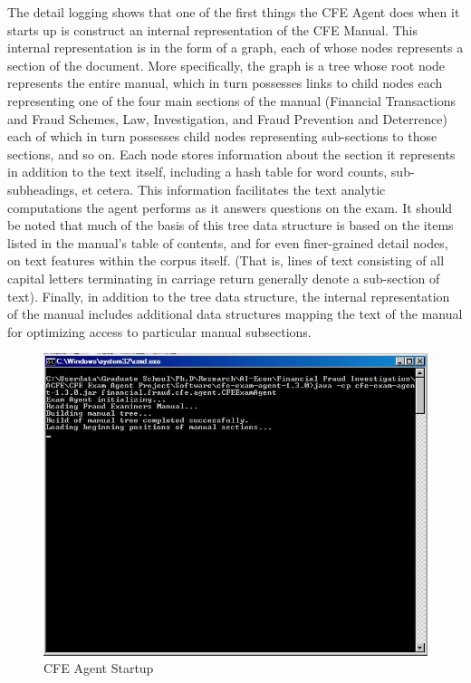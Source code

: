 The detail logging shows that one of the first things the CFE Agent does when it starts up is construct an internal representation of the CFE Manual.  This internal representation is in the form of a graph, each of whose nodes represents a section of the document.  More specifically, the graph is a tree whose root node represents the entire manual, which in turn possesses links to child nodes each representing one of the four main sections of the manual (Financial Transactions and Fraud Schemes, Law, Investigation, and Fraud Prevention and Deterrence) each of which in turn possesses child nodes representing sub-sections to those sections, and so on.  Each node stores information about the section it represents in addition to the text itself, including a hash table for word counts, sub-subheadings, et cetera.  This information facilitates the text analytic computations the agent performs as it answers questions on the exam.  It should be noted that much of the basis of this tree data structure is based on the items listed in the manual’s table of contents, and for even finer-grained detail nodes, on text features within the corpus itself.  (That is, lines of text consisting of all capital letters terminating in carriage return generally denote a sub-section of text).  Finally, in addition to the tree data structure, the internal representation of the manual includes additional data structures mapping the text of the manual for optimizing access to particular manual subsections.

\begin{figure}
\centering
\includegraphics[scale=0.75]{screen_shot_1.jpg}
\caption{CFE Agent Startup}
\label{fig:cfe_agent_startup}
\end{figure}


